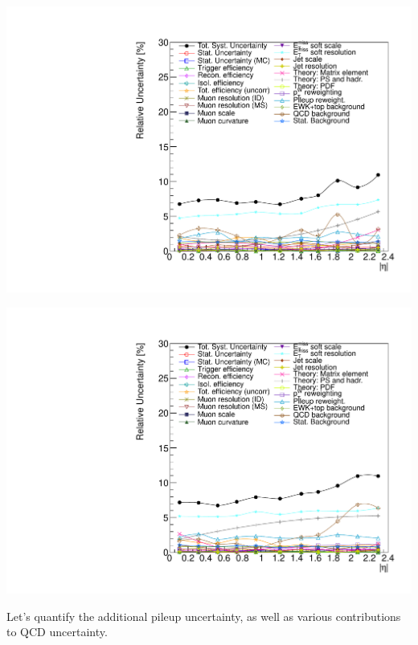 {
\colb[T]
\centering
{}
\includegraphics[width=1.0\textwidth]{dates/20130602/figures/v26.allqcd/Wmn_SYSTEM30_2D_PT20_NEG_Unc_2d_Slice_1}

\centering
{}
\includegraphics[width=1.0\textwidth]{dates/20130602/figures/v26.allqcd/Wmn_SYSTEM30_2D_PT20_POS_Unc_2d_Slice_1}
\cole
}

{
Let's quantify the additional pileup uncertainty, as well as various contributions to QCD uncertainty.
}

